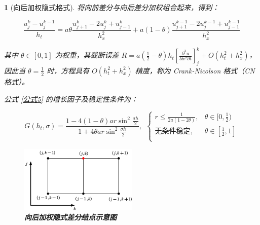 \documentclass[zihao=5,UTF8]{report}
\theoremstyle{MyTheoremStyle} %
\theoremstyle{MySubsubsectionStyle} %
\newtheorem{definition}{}
\begin{document}
\begin{definition}[向后加权隐式格式]

将向前差分与向后差分加权组合起来，得到：

\begin{equation}\label{公式5}
    \frac{u_{j}^{k}-u_{j}^{k-1}}{h_t}=a\theta\frac{u_{j+1}^{k}-2u_{j}^{k}+u_{j-1}^{k}}{h_x^2}+a(1-\theta)\frac{u_{j+1}^{k-1}-2u_{j}^{k-1}+u_{j-1}^{k-1}}{h_x^2}
\end{equation}

其中 $\theta \in [0, 1]$ 为权重，其截断误差 $R = a\left(\frac{1}{2}-\theta\right)h_t\left[\frac{\partial^{3}u}{\partial x^{2}\partial t}\right]_{j}^{k}+O(h_t^{2}+h_x^2)$，因此当 $\theta = \frac{1}{2}$ 时，方程具有 $O(h_t^{2}+h_x^2)$ 精度，称为 Crank-Nicolson 格式（CN 格式）。


公式 \ref{公式5} 的增长因子及稳定性条件为：

\begin{equation}
    G(h_t,\sigma)=\frac{1-4(1-\theta)ar\sin^2\frac{\sigma h}2}{1+4\theta ar\sin^2\frac{\sigma h}2}, \ \ 
    \begin{cases}
        r\leqslant\frac{1}{2a(1-2\theta)}, & \theta \in [0, \frac{1}{2}) \\ 
        \text{无条件稳定}, & \theta \in [\frac{1}{2}, 1] \\ 
    \end{cases}
\end{equation}

\begin{figure}[H]
    \centering
    \includegraphics[width=0.5\textwidth]{assets/差分格式示意图.pdf}
    \caption{\textbf{向后加权隐式差分结点示意图}}\label{向后加权隐式差分结点示意图}
\end{figure}
\end{definition}
\end{document}
